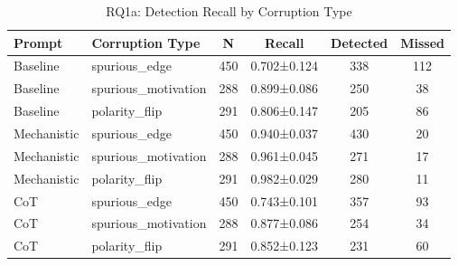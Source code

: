 \begin{table}[htbp]
\centering
\caption{RQ1a: Detection Recall by Corruption Type}
\label{tab:rq1a_corruption_type}
\begin{tabular}{llcccc}
\toprule
\textbf{Prompt} & \textbf{Corruption Type} & \textbf{N} & \textbf{Recall} & \textbf{Detected} & \textbf{Missed} \\
\midrule
Baseline & spurious_edge & 450 & 0.702±0.124 & 338 & 112 \\
Baseline & spurious_motivation & 288 & 0.899±0.086 & 250 & 38 \\
Baseline & polarity_flip & 291 & 0.806±0.147 & 205 & 86 \\
Mechanistic & spurious_edge & 450 & 0.940±0.037 & 430 & 20 \\
Mechanistic & spurious_motivation & 288 & 0.961±0.045 & 271 & 17 \\
Mechanistic & polarity_flip & 291 & 0.982±0.029 & 280 & 11 \\
CoT & spurious_edge & 450 & 0.743±0.101 & 357 & 93 \\
CoT & spurious_motivation & 288 & 0.877±0.086 & 254 & 34 \\
CoT & polarity_flip & 291 & 0.852±0.123 & 231 & 60 \\
\bottomrule
\end{tabular}
\end{table}